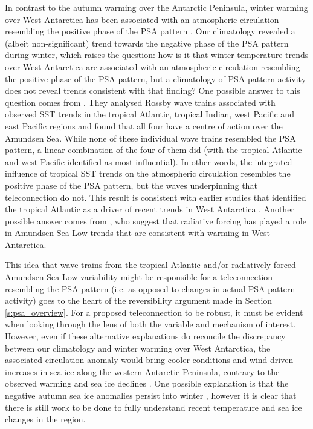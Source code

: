 In contrast to the autumn warming over the Antarctic Peninsula, winter warming over West Antarctica has been associated with an atmospheric circulation resembling the positive phase of the PSA pattern \citep{Ding2011}. Our climatology revealed a (albeit non-significant) trend towards the negative phase of the PSA pattern during winter, which raises the question: how is it that winter temperature trends over West Antarctica are associated with an atmospheric circulation resembling the positive phase of the PSA pattern, but a climatology of PSA pattern activity does not reveal trends consistent with that finding? One possible answer to this question comes from \citet{Li2015a}. They analysed Rossby wave trains associated with observed SST trends in the tropical Atlantic, tropical Indian, west Pacific and east Pacific regions and found that all four have a centre of action over the Amundsen Sea. While none of these individual wave trains resembled the PSA pattern, a linear combination of the four of them did (with the tropical Atlantic and west Pacific identified as most influential). In other words, the integrated influence of tropical SST trends on the atmospheric circulation resembles the positive phase of the PSA pattern, but the waves underpinning that teleconnection do not. This result is consistent with earlier studies that identified the tropical Atlantic as a driver of recent trends in West Antarctica \citep{Li2014,Simpkins2014}. Another possible answer comes from \citet{Fogt2015}, who suggest that radiative forcing has played a role in Amundsen Sea Low trends that are consistent with warming in West Antarctica. 

This idea that wave trains from the tropical Atlantic and/or radiatively forced Amundsen Sea Low variability might be responsible for a teleconnection resembling the PSA pattern (i.e. as opposed to changes in actual PSA pattern activity) goes to the heart of the reversibility argument made in Section \ref{s:psa_overview}. For a proposed teleconnection to be robust, it must be evident when looking through the lens of both the variable and mechanism of interest. However, even if these alternative explanations do reconcile the discrepancy between our climatology and winter warming over West Antarctica, the associated circulation anomaly would bring cooler conditions and wind-driven increases in sea ice along the western Antarctic Peninsula, contrary to the observed warming and sea ice declines \citep{Clem2015}. One possible explanation is that the negative autumn sea ice anomalies persist into winter \citep{Ding2013}, however it is clear that there is still work to be done to fully understand recent temperature and sea ice changes in the region.

